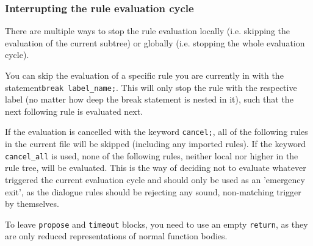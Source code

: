 
\subsubsection{Interrupting the rule evaluation cycle}

%
There are multiple ways to stop the rule evaluation locally (i.e. skipping the evaluation of the current subtree) or globally (i.e. stopping the whole evaluation cycle).

You can skip the evaluation of a specific rule you are currently in with the statement\verb|break label_name;|. This will only stop the rule with the respective label (no matter how deep the break statement is nested in it), such that the next following rule is evaluated next.

%
If the evaluation is cancelled with the keyword \texttt{cancel;}, all of the following rules in the current file will be skipped (including any imported rules). If the keyword \texttt{cancel\_all} is used, none of the following rules, neither local nor higher in the rule tree, will be evaluated. This is the \vonda way of deciding not to evaluate whatever triggered the current evaluation cycle and should only be used as an 'emergency exit', as the dialogue rules should be rejecting any sound, non-matching trigger by themselves.


To leave \texttt{propose} and \texttt{timeout} blocks, you need to use an empty \texttt{return}, as they are only reduced representations of normal function bodies.

